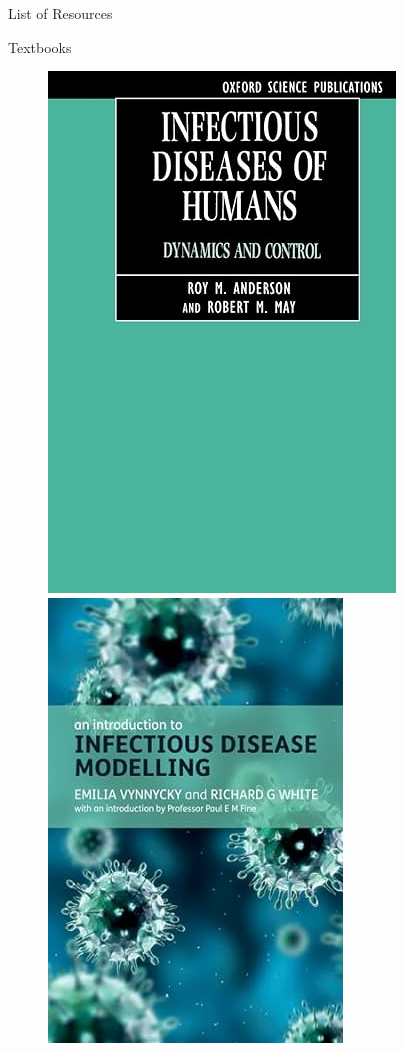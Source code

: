 \documentclass[
  ignorenonframetext,
]{beamer}
\begin{document}
\begin{frame}{List of Resources}
\label{list-of-resources}
\end{frame}

\begin{frame}
\begin{block}{Textbooks}
\label{textbooks}
\begin{figure}

\begin{minipage}{0.50\linewidth}
\includegraphics{images/Anderson_and_May.jpeg}\end{minipage}%
%
\begin{minipage}{0.50\linewidth}
\includegraphics{images/ID_modelling_Vynnycky_and_White.jpeg}\end{minipage}%

\end{figure}%
\end{block}
\end{frame}
\end{document}
